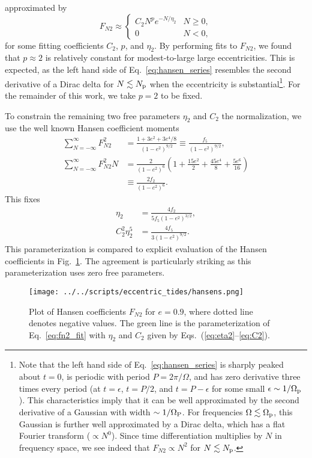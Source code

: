 \documentclass[
        fleqn,
        usenatbib,
    ]{mnras}
\newcommand*{\p}[1]{\left(#1\right)}
\begin{document}
approximated by
\begin{equation}
    F_{N2} \approx
    \begin{cases}
        C_2 N^{p}e^{-N/\eta_2} & N \geq 0,\\
        0 & N < 0,
    \end{cases}\label{eq:fn2_fit}
\end{equation}
for some fitting coefficients $C_2$, $p$, and $\eta_2$. By performing fits to
$F_{N2}$, we found that $p \approx 2$ is relatively constant for modest-to-large
large eccentricities. This is expected, as the left hand side of
Eq.~\eqref{eq:hansen_series} resembles the second derivative of a Dirac delta
for $N \lesssim N_{\rm p}$ when the eccentricity is substantial\footnote{
Note that the left hand side of Eq.~\eqref{eq:hansen_series} is
sharply peaked about $t = 0$, is periodic with period $P = 2\pi / \Omega$, and
has zero derivative three times every period (at $t = \epsilon$, $t = P / 2$,
and $t = P - \epsilon$ for some small $\epsilon \sim 1 / \Omega_{\rm p}$). This
characteristics imply that it can be well approximated by the second derivative
of a Gaussian with width $\sim 1 / \Omega_{\rm P}$. For frequencies $\Omega
\lesssim \Omega_{\rm p}$, this Gaussian is further well approximated by a Dirac
delta, which has a flat Fourier transform ($\propto N^0$). Since time
differentiation multiplies by $N$ in frequency space, we see indeed that $F_{N2}
\propto N^2$ for $N \lesssim N_{\rm p}$.}. For the remainder of this work, we
take $p = 2$ to be fixed.

To constrain the remaining two free parameters $\eta_2$ and $C_2$ the
normalization, we use the well known Hansen coefficient moments
\citep{hut81}
\begin{align}
    \sum\limits_{N = -\infty}^\infty F_{N2}^2
        &= \frac{1 + 3e^2 + 3e^4/8}{\p{1 - e^2}^{9/2}}
            \equiv \frac{f_5}{\p{1 - e^2}^{9/2}},\label{eq:moment_FN2}\\
    \sum\limits_{N = -\infty}^\infty F_{N2}^2N
        &= \frac{2}{\p{1 - e^2}^6}\p{1 + \frac{15e^2}{2}
            + \frac{45 e^4}{8} + \frac{5e^6}{16}}\nonumber\\
        &\equiv \frac{2f_2}{\p{1 - e^2}^6}.\label{eq:moment_FN2_1}
\end{align}
This fixes
\begin{align}
    \eta_2 &= \frac{4f_2}{5f_5\p{1 - e^2}^{3/2}},\label{eq:eta2}\\
    C_2^2\eta_2^5 &= \frac{4f_5}{3\p{1 - e^2}^{9/2}}.\label{eq:C2}
\end{align}
This parameterization is compared to explicit evaluation of the Hansen
coefficients in Fig.~\ref{fig:hansens}. The agreement is particularly striking
as this parameterization uses zero free parameters.
\begin{figure}
    \centering
    \texttt{[image: ../../scripts/eccentric\_tides/hansens.png]}
    \caption{Plot of Hansen coefficients $F_{N2}$ for $e = 0.9$, where dotted
    line denotes negative values. The green line is the parameterization
    of Eq.~\eqref{eq:fn2_fit} with $\eta_2$ and $C_2$ given by
    Eqs.~(\ref{eq:eta2}--\ref{eq:C2}). }\label{fig:hansens}
\end{figure}
\end{document}
